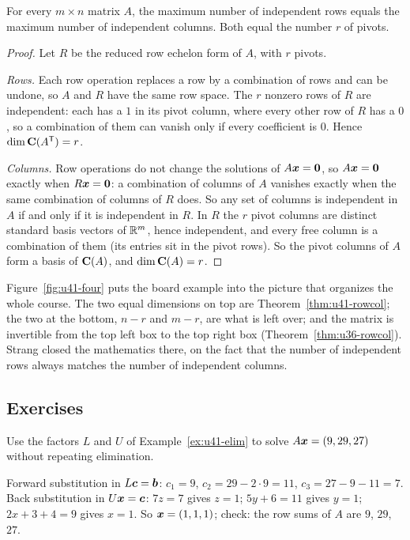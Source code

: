 \begin{theorem}\label{thm:u41-rowcol}
For every $m\times n$ matrix $A$, the maximum number of independent rows equals the maximum number of independent columns. Both equal the number $r$ of pivots.
\end{theorem}
\begin{proof}
Let $R$ be the reduced row echelon form of $A$, with $r$ pivots.

\emph{Rows.} Each row operation replaces a row by a combination of rows and can be undone, so $A$ and $R$ have the same row space. The $r$ nonzero rows of $R$ are independent: each has a $1$ in its pivot column, where every other row of $R$ has a $0$, so a combination of them can vanish only if every coefficient is $0$. Hence $\dim\mathbf{C}(A^{\mathsf{T}})=r$.

\emph{Columns.} Row operations do not change the solutions of $A\boldsymbol{x}=\boldsymbol{0}$, so $A\boldsymbol{x}=\boldsymbol{0}$ exactly when $R\boldsymbol{x}=\boldsymbol{0}$: a combination of columns of $A$ vanishes exactly when the same combination of columns of $R$ does. So any set of columns is independent in $A$ if and only if it is independent in $R$. In $R$ the $r$ pivot columns are distinct standard basis vectors of $\mathbb{R}^{m}$, hence independent, and every free column is a combination of them (its entries sit in the pivot rows). So the pivot columns of $A$ form a basis of $\mathbf{C}(A)$, and $\dim\mathbf{C}(A)=r$.
\end{proof}

Figure~\ref{fig:u41-four} puts the board example into the picture that organizes the whole course. The two equal dimensions on top are Theorem~\ref{thm:u41-rowcol}; the two at the bottom, $n-r$ and $m-r$, are what is left over; and the matrix is invertible from the top left box to the top right box (Theorem~\ref{thm:u36-rowcol}). Strang closed the mathematics there, on the fact that the number of independent rows always matches the number of independent columns.

\subsection{Exercises}

\begin{exercise}\label{exr:u41-lu}
Use the factors $L$ and $U$ of Example~\ref{ex:u41-elim} to solve $A\boldsymbol{x}=(9,29,27)$ without repeating elimination.
\end{exercise}
\begin{solution}
Forward substitution in $L\boldsymbol{c}=\boldsymbol{b}$: $c_1=9$, $c_2=29-2\cdot9=11$, $c_3=27-9-11=7$. Back substitution in $U\boldsymbol{x}=\boldsymbol{c}$: $7z=7$ gives $z=1$; $5y+6=11$ gives $y=1$; $2x+3+4=9$ gives $x=1$. So $\boldsymbol{x}=(1,1,1)$; check: the row sums of $A$ are $9$, $29$, $27$.
\end{solution}


